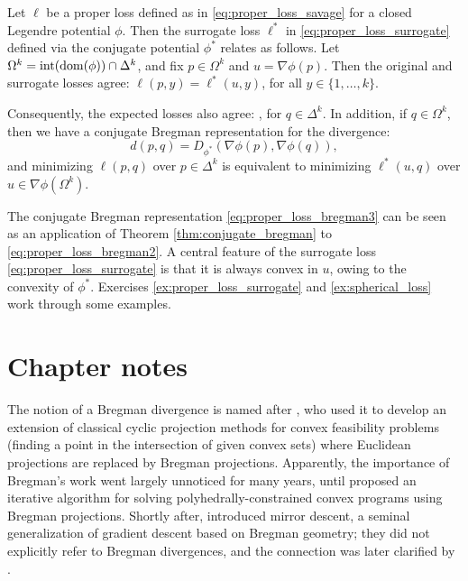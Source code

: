\begin{Theorem}
\label{thm:proper_loss_conjugate}
Let $\ell$ be a proper loss defined as in \eqref{eq:proper_loss_savage} for a
closed Legendre potential $\phi$. Then the surrogate loss $\ell^*$ in
\eqref{eq:proper_loss_surrogate} defined via the conjugate potential $\phi^*$
relates as follows. Let $\Omega^k = \operatorname{int}(\operatorname{dom}(\phi)) \cap \Delta^k$, and
fix $p \in \Omega^k$ and $u = \nabla\phi(p)$. Then the original and surrogate
losses agree: $\ell(p,y) = \ell^*(u,y)$, for all $y \in \{1,\dots,k\}$.   

\setlength{\parindent}{\normalparindent}
Consequently, the expected losses also agree: , for $q \in \Delta^k$. In addition, if $q
\in \Omega^k$, then we have a conjugate Bregman representation for the
divergence:    
\begin{equation}
\label{eq:proper_loss_bregman3}
d(p,q) = D_{\phi^*}(\nabla\phi(p), \nabla\phi(q)),
\end{equation}
and minimizing $\ell(p,q)$ over $p \in \Delta^k$ is equivalent to minimizing
$\ell^*(u,q)$ over $u \in \nabla\phi(\Omega^k)$.  
\end{Theorem}

The conjugate Bregman representation \eqref{eq:proper_loss_bregman3} 
can be seen as an application of Theorem \ref{thm:conjugate_bregman} to 
\eqref{eq:proper_loss_bregman2}. A central feature of the surrogate loss
\eqref{eq:proper_loss_surrogate} is that it is always convex in $u$, owing to
the convexity of $\phi^*$. Exercises \ref{ex:proper_loss_surrogate} and
\ref{ex:spherical_loss} work through some examples.      

\SkipTocEntry\section*{Chapter notes}

The notion of a Bregman divergence is named after
\cite{bregman1967relaxation}, who used it to develop an extension of
classical cyclic projection methods for convex feasibility problems (finding a
point in the intersection of given convex sets) where Euclidean projections are
replaced by Bregman projections. Apparently, the importance of Bregman's work
went largely unnoticed for many years, until \cite{censor1981iterative} proposed
an iterative algorithm for solving polyhedrally-constrained convex programs
using Bregman projections. Shortly after, \cite{nemirovski1983problem}
introduced mirror descent, a seminal generalization of gradient descent based on
Bregman geometry; they did not explicitly refer to Bregman divergences, and the
connection was later clarified by \cite{beck2003mirror}.

